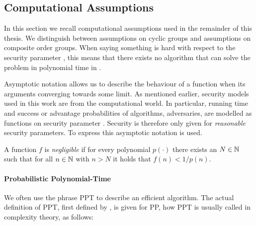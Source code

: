 \subsection{Computational Assumptions}
In this section we recall computational assumptions used in the remainder of this thesis.
We distinguish between assumptions on cyclic groups and assumptions on composite order groups.
When saying something is hard with respect to the security parameter \secpar, this means that there exists no algorithm that can solve the problem in polynomial time in \secpar.

Asymptotic notation allows us to describe the behaviour of a function when its arguments converging towards some limit.
As mentioned earlier, security models used in this work are from the computational world.
In particular, running time and success or advantage probabilities of algorithms, \ie adversaries, are modelled as functions on security parameter \secpar.
Security is therefore only given for \emph{reasonable} security parameters.
To express this asymptotic notation is used.

\begin{definition}\label{def:negligible}
A function $f$ is \emph{negligible} if for every polynomial $p(\cdot)$ there exists an $N\in\mathbb{N}$ such that for all $n\in\mathbb{N}$ with $n>N$ it holds that $f(n)<1/p(n)$.
\eod
\end{definition}


\paragraph{Probabilistic Polynomial-Time}
We often use the phrase \ac{PPT} to describe an efficient algorithm.
The actual definition of \ac{PPT}, first defined by \citet{gill1977}, is given for \ac{PP}, how \ac{PPT} is usually called in complexity theory, as follows:

